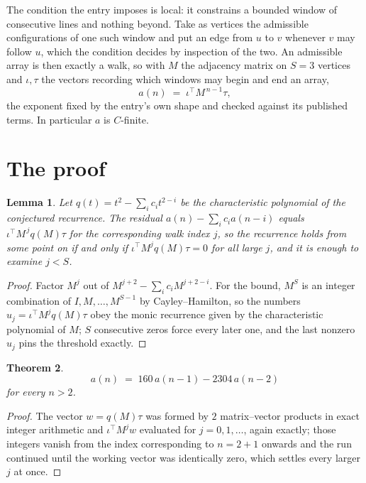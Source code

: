 \documentclass[11pt,a4paper]{article}
\theoremstyle{plain}
\newtheorem{theorem}{Theorem}
\newtheorem{lemma}[theorem]{Lemma}
\theoremstyle{definition}
\begin{document}
The condition the entry imposes is local: it constrains a bounded window of consecutive lines and nothing beyond. Take as
vertices the admissible configurations of one such window and put an edge from $u$ to $v$
whenever $v$ may follow $u$, which the condition decides by inspection of the two. An
admissible array is then exactly a walk, so with $M$ the adjacency matrix on $S=3$ vertices
and $\iota,\tau$ the vectors recording which windows may begin and end an array,
\[
a(n)\;=\;\iota^{\!\top}M^{\,n-1}\tau ,
\]
the exponent fixed by the entry's own shape and checked against its published terms. In
particular $a$ is $C$-finite.

\section{The proof}

\begin{lemma}\label{lem:crit}
Let $q(t)=t^{2}-\sum_i c_it^{2-i}$ be the characteristic polynomial of the
conjectured recurrence. The residual $a(n)-\sum_ic_ia(n-i)$ equals
$\iota^{\!\top}M^{\,j}q(M)\tau$ for the corresponding walk index $j$, so the recurrence
holds from some point on if and only if $\iota^{\!\top}M^{j}q(M)\tau=0$ for all large $j$,
and it is enough to examine $j<S$.
\end{lemma}

\begin{proof}
Factor $M^{j}$ out of $M^{j+2}-\sum_ic_iM^{j+2-i}$. For the bound, $M^{S}$
is an integer combination of $I,M,\dots,M^{S-1}$ by Cayley--Hamilton, so the numbers
$u_j=\iota^{\!\top}M^{j}q(M)\tau$ obey the monic recurrence given by the characteristic
polynomial of $M$; $S$ consecutive zeros force every later one, and the last nonzero $u_j$
pins the threshold exactly.
\end{proof}

\begin{theorem}
\[
a(n)\;=\;160\,a(n-1) - 2304\,a(n-2)
\]
for every $n>2$.
\end{theorem}

\begin{proof}
The vector $w=q(M)\tau$ was formed by $2$ matrix--vector products in exact integer
arithmetic and $\iota^{\!\top}M^{j}w$ evaluated for $j=0,1,\dots$, again exactly; those
integers vanish from the index corresponding to $n=2+1$ onwards and the run continued
until the working vector was identically zero, which settles every larger $j$ at once.
\end{proof}
\end{document}

